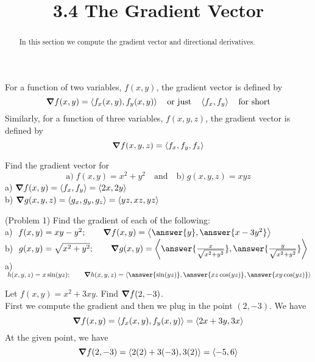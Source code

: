 \documentclass[handout]{ximera}
\title{3.4 The Gradient Vector}
\begin{document}
\begin{abstract}
In this section we compute the gradient vector and directional derivatives.
\end{abstract}

\maketitle

\begin{definition}
For a function of two variables, $f(x,y)$, the gradient vector is defined by
\[
\boldsymbol\nabla f(x,y) = \left\langle f_x(x,y), f_y(x,y)\right\rangle \quad \text{or just} \quad \left\langle f_x, f_y\right\rangle \quad \text{for short}
\]
Similarly, for a function of three variables, $f(x,y, z)$, the gradient vector is defined by
\[
\boldsymbol\nabla f(x,y, z) = \left\langle f_x, f_y, f_z\right\rangle
\]
\end{definition}

\begin{example}[Example 1]
Find the gradient vector for 
\[
\text{a)} \;f(x,y) = x^2 + y^2\quad \text{and} \quad  \text{b)} \;g(x, y, z) = xyz
\]
a) $\boldsymbol\nabla f(x,y) = \left\langle f_x, f_y\right\rangle = \left\langle 2x, 2y\right\rangle$ \\
b) $\boldsymbol\nabla g(x,y, z) = \left\langle g_x, g_y, g_z\right\rangle= \left\langle yz, xz, yz\right\rangle$
\end{example}

\begin{problem}(Problem 1)
Find the gradient of each of the following:\\
a) $\;f(x,y) = xy - y^2; \quad \quad \grad f(x,y) = \vector{\answer{y}, \answer{x - 3y^2}}$\\
b) $\;g(x,y) = \sqrt{x^2 + y^2}; \quad \quad  \grad g(x,y) = \vector{\answer{\frac{x}{\sqrt{x^2 + y^2}}}, \answer{\frac{y}{\sqrt{x^2 + y^2}}}}$\\
a) $\;h(x,y, z) = x\sin(yz); \quad \quad \grad h(x,y, z) = \vector{\answer{\sin(yz)}, \answer{xz\cos(yz)} , \answer{xy\cos(yz)} }$\\
\end{problem}


\begin{example}[Example 2]
Let $f(x,y) = x^2 + 3xy$.  Find $\boldsymbol\nabla f(2, -3)$.\\
First we compute the gradient and then we plug in the point $(2, -3)$.  We have
\[
\boldsymbol\nabla f(x,y) = \left\langle f_x(x,y), f_y(x,y)\right\rangle = \left\langle 2x + 3y, 3x\right\rangle
\]
At the given point, we have
\[
\boldsymbol\nabla f(2, -3) = \left\langle 2(2) + 3(-3), 3(2)\right\rangle = \left\langle -5, 6\right\rangle
\]
\end{example}
\end{document}
